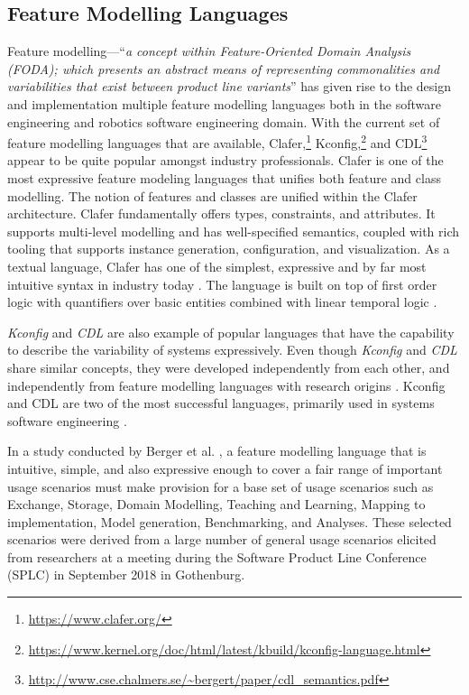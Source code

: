 \documentclass[conference]{IEEEtran}
\newcommand{\foot}[1]{\footnote{\url{#1}}}
\begin{document}
 \subsection{Feature Modelling Languages}
Feature modelling---``{\em a concept within Feature-Oriented Domain Analysis (FODA)\cite{foda-tech-rep}; which presents an abstract means of representing commonalities and variabilities that exist between product line variants}'' has given rise to the design and implementation multiple feature modelling languages both in the software engineering and robotics software engineering domain.
With the current set of feature modelling languages that
are available, Clafer,\foot{https://www.clafer.org/} Kconfig,\foot{https://www.kernel.org/doc/html/latest/kbuild/kconfig-language.html} and CDL\foot{http://www.cse.chalmers.se/~bergert/paper/cdl_semantics.pdf} appear to be quite popular amongst industry professionals. Clafer is one of the most expressive feature modeling languages that unifies both feature and class modelling. The notion of features and classes are unified within the Clafer architecture. Clafer fundamentally offers types, constraints, and attributes. It supports multi-level modelling and has well-specified semantics, coupled with rich tooling that supports instance generation, configuration, and visualization. As a textual language, Clafer has one of the simplest, expressive and by far most intuitive syntax in industry today \cite{fmod-lang-scenarios}. The language is built on top of first order logic with quantifiers over basic entities combined with linear temporal logic \cite{clafer}.

\textit{Kconfig} and \textit{CDL} are also example of popular languages that have the capability to describe the variability of systems expressively. Even though \textit{Kconfig} and \textit{CDL} share similar concepts, they were developed independently from each other, and independently from feature modelling languages with research origins \cite{vmir}. Kconfig and CDL are two of the most successful languages, primarily used in systems software engineering \cite{fmod-lang-scenarios}. 

In a study conducted by Berger et al. \cite{fmod-lang-scenarios}, a feature modelling language that is intuitive, simple, and also expressive enough to cover a fair range of important usage scenarios must make provision for a base set of usage scenarios such as Exchange, Storage, Domain Modelling, Teaching and Learning, Mapping to implementation, Model generation, Benchmarking, and Analyses. These selected scenarios were derived from a large number of general usage scenarios elicited from researchers at a meeting during the Software Product Line Conference (SPLC) in September 2018 in Gothenburg.
\end{document}
